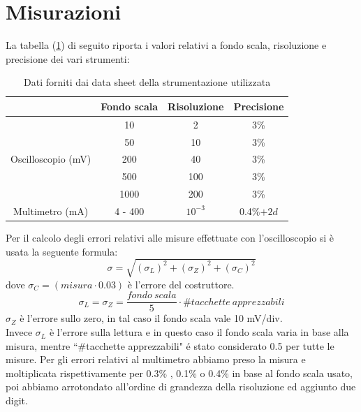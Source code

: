 \documentclass[]{article}
\begin{document}
\section{Misurazioni}
La tabella (\ref{tab:strumenti}) di seguito riporta i valori relativi a fondo scala, risoluzione e precisione dei vari strumenti:
	\begin{table}[H]
		\centering
		\begin{tabular}{|c|c|c|c|}
			\cline{2-4}
			\multicolumn{1}{c|}{} & Fondo scala & Risoluzione & Precisione \\
			\hline
			\multirow{5}{*}{Oscilloscopio (mV)} & 10 & 2 & 3\% \\
			\cline{2-4}
			& 50 & 10 & 3\% \\
			\cline{2-4}
			& 200 & 40 & 3\% \\
			\cline{2-4}
			&500 & 100 & 3\% \\
			\cline{2-4}
			&1000 & 200 & 3\% \\
			\hline
			Multimetro (mA) & 4 - 400 & $10^{-3}$ & 0.4\%$+2d$ \\
			\hline
		\end{tabular}
	\label{tab:strumenti}
	\caption{Dati forniti dai data sheet della strumentazione utilizzata}
	\end{table}
Per il calcolo degli errori relativi alle misure effettuate con l'oscilloscopio si è usata la seguente formula:
\begin{equation}
	\sigma=\sqrt{(\sigma_{L})^{2}+(\sigma_{Z})^{2}+(\sigma_{C})^{2}}
\end{equation}
dove $\sigma_{C}= (misura\cdot0.03) $ è l'errore del costruttore. 
\begin{equation*}
	\sigma_{L}=\sigma_{Z}=\frac{fondo \:scala}{5}\cdot\#tacchette \:apprezzabili
\end{equation*}
$ \sigma_{Z} $ è l'errore sullo zero, in tal caso il fondo scala vale 10 mV/div.\\
Invece $ \sigma_{L} $ è l'errore sulla lettura e in questo caso il fondo scala varia in base alla misura, mentre ``\#tacchette apprezzabili" é stato considerato 0.5 per tutte le misure.
Per gli errori relativi al multimetro abbiamo preso la misura e moltiplicata rispettivamente per 0.3\% , 0.1\% o 0.4\%  in base al fondo scala usato, poi abbiamo arrotondato all'ordine di grandezza della risoluzione ed aggiunto due digit.
\end{document}

